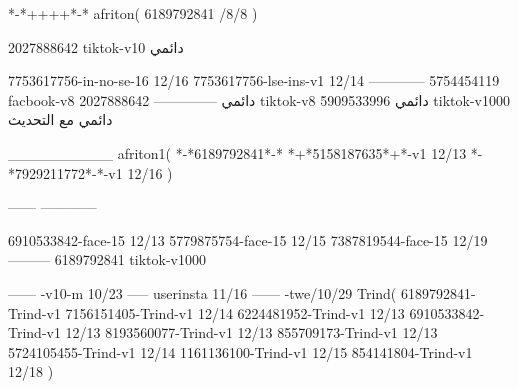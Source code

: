 *-*++++*-*
afriton(
6189792841 /8/8
)

2027888642 tiktok-v10
دائمي

7753617756-in-no-se-16 12/16
7753617756-lse-ins-v1 12/14
------------
5754454119 facbook-v8
دائمي
--------------
2027888642 tiktok-v8
دائمي
5909533996 tiktok-v1000
دائمي مع التحديث

__________
afriton1(
*-*6189792841*-*
*+*5158187635*+*-v1 12/13
*-*7929211772*-*-v1 12/16
)

------
------------


6910533842-face-15 12/13
5779875754-face-15 12/15
7387819544-face-15 12/19
---------
6189792841 tiktok-v1000
 
------
-v10-m 10/23
-----
userinsta 11/16
------
-twe/10/29
Trind(
6189792841-Trind-v1 
7156151405-Trind-v1 12/14
6224481952-Trind-v1 12/13
6910533842-Trind-v1 12/13
8193560077-Trind-v1 12/13
855709173-Trind-v1 12/13
5724105455-Trind-v1 12/14
1161136100-Trind-v1 12/15
854141804-Trind-v1 12/18
)
